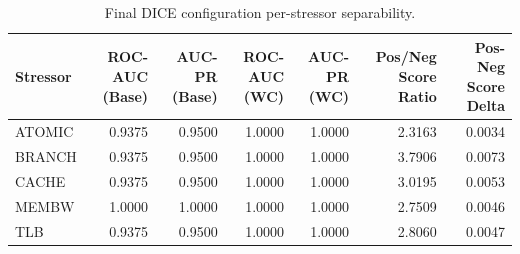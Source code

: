 \begin{table}[t]
\centering
\caption{Final DICE configuration per-stressor separability.}
\label{tab:dice_full_stressor}
\footnotesize
\begin{tabular}{lrrrrrr}
\toprule
Stressor & ROC-AUC (Base) & AUC-PR (Base) & ROC-AUC (WC) & AUC-PR (WC) & Pos/Neg Score Ratio & Pos-Neg Score Delta \\
\midrule
ATOMIC & 0.9375 & 0.9500 & 1.0000 & 1.0000 & 2.3163 & 0.0034 \\
BRANCH & 0.9375 & 0.9500 & 1.0000 & 1.0000 & 3.7906 & 0.0073 \\
CACHE & 0.9375 & 0.9500 & 1.0000 & 1.0000 & 3.0195 & 0.0053 \\
MEMBW & 1.0000 & 1.0000 & 1.0000 & 1.0000 & 2.7509 & 0.0046 \\
TLB & 0.9375 & 0.9500 & 1.0000 & 1.0000 & 2.8060 & 0.0047 \\
\bottomrule
\end{tabular}

\end{table}

